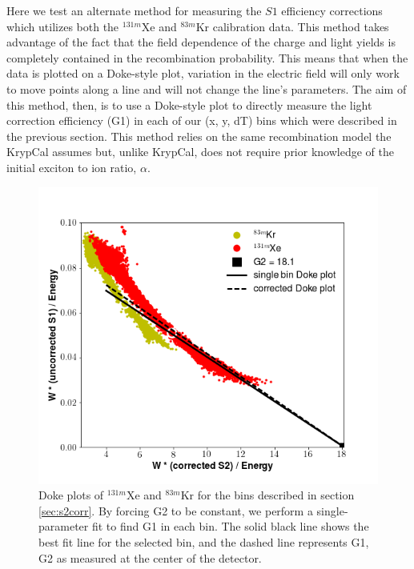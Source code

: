 {Here we test an alternate method for measuring the $S1$ efficiency corrections which utilizes both the $^{131m}$Xe and $^{83m}$Kr calibration data. This method takes advantage of the fact that the field dependence of the charge and light yields is completely contained in the recombination probability. This means that when the data is plotted on a Doke-style plot, variation in the electric field will only work to move points along a line and will not change the line's parameters. The aim of this method, then, is to use a Doke-style plot to directly measure the light correction efficiency (G1) in each of our (x, y, dT) bins which were described in the previous section. This method relies on the same recombination model the KrypCal assumes but, unlike KrypCal, does not require prior knowledge of the initial exciton to ion ratio, $\alpha$.
\begin{figure}[h!]
\centering
\includegraphics[width=150mm]{Figures/S1corr_singlebin.png}
\caption{Doke plots of $^{131m}$Xe and $^{83m}$Kr for the bins described in section \ref{sec:s2corr}. By forcing G2 to be constant, we perform a single-parameter fit to find G1 in each bin. The solid black line shows the best fit line for the selected bin, and the dashed line represents G1, G2 as measured at the center of the detector.  }
\label{fig:S1corr_singlebin} 
\end{figure}

}
